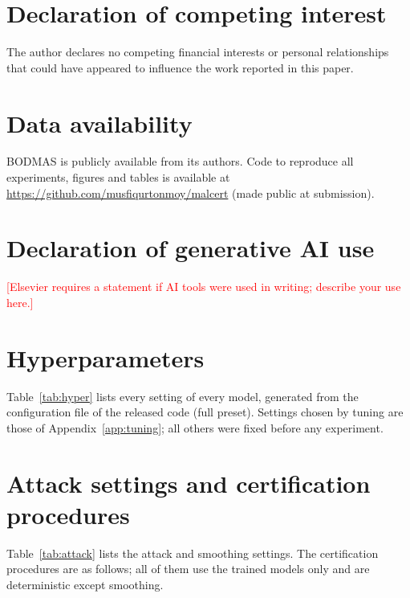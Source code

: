 \documentclass[preprint,12pt,authoryear]{elsarticle}
\begin{document}
\section*{Declaration of competing interest}
The author declares no competing financial interests or personal relationships that could have appeared to influence the work reported in this paper.

\section*{Data availability}
BODMAS is publicly available from its authors. Code to reproduce all experiments, figures and tables is available at \url{https://github.com/musfiqurtonmoy/malcert} (made public at submission).

\section*{Declaration of generative AI use}
\textcolor{red}{[Elsevier requires a statement if AI tools were used in writing; describe your use here.]}

\FloatBarrier
\appendix
\section{Hyperparameters}\label{app:hyper}
Table~\ref{tab:hyper} lists every setting of every model, generated from the configuration file of the released code (full preset). Settings chosen by tuning are those of Appendix~\ref{app:tuning}; all others were fixed before any experiment.

\begin{table}[!htbp]
\centering\small
\caption{Hyperparameters of all models (generated from \texttt{malcert/config.py} and \texttt{run\_all.py}).}\label{tab:hyper}

\end{table}

\FloatBarrier
\section{Attack settings and certification procedures}\label{app:proc}
Table~\ref{tab:attack} lists the attack and smoothing settings. The certification procedures are as follows; all of them use the trained models only and are deterministic except smoothing.

\begin{table}[!htbp]
\centering\small
\caption{Attack and certification settings (generated from \texttt{malcert/config.py}).}\label{tab:attack}

\end{table}
\end{document}

